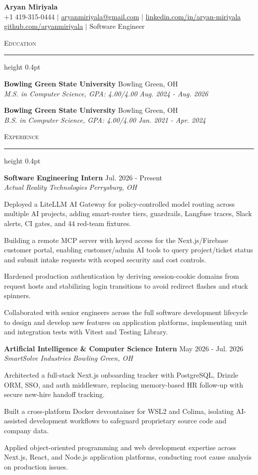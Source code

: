 \documentclass[letterpaper,11pt]{article}
\newcommand{\resumesection}[1]{%
  \par\vspace{2pt}%
  {\large\scshape #1}\par\vspace{2pt}%
  \hrule height 0.4pt\vspace{2pt}%
}
\newcommand{\resumeSubheading}[4]{
  \textbf{#1} \hfill #2\\
  \textit{#3} \hfill \textit{#4}
}
\begin{document}
\begin{center}
  {\LARGE \textbf{Aryan Miriyala}}\\[2pt]
  \small
  +1 419-315-0444 $|$ \href{mailto:aryanmiriyala@gmail.com}{aryanmiriyala@gmail.com} $|$ \href{https://www.linkedin.com/in/aryan-miriyala-7788a21b6/}{linkedin.com/in/aryan-miriyala}\\
  \href{https://github.com/aryanmiriyala}{github.com/aryanmiriyala} $|$ Software Engineer
\end{center}\vspace{-6pt}

\resumesection{Education}
\resumeSubheading
{Bowling Green State University}{Bowling Green, OH}
{M.S. in Computer Science, GPA: 4.00/4.00}{Aug. 2024 - Aug. 2026}

\resumeSubheading
{Bowling Green State University}{Bowling Green, OH}
{B.S. in Computer Science, GPA: 4.00/4.00}{Jan. 2021 - Apr. 2024}

\resumesection{Experience}
\resumeSubheading
{Software Engineering Intern}{Jul. 2026 - Present}
{Actual Reality Technologies}{Perrysburg, OH}
\begin{tightitemize}
  \item Deployed a LiteLLM AI Gateway for policy-controlled model routing across multiple AI projects, adding smart-router tiers, guardrails, Langfuse traces, Slack alerts, CI gates, and 44 red-team fixtures.
  \item Building a remote MCP server with keyed access for the Next.js/Firebase customer portal, enabling customer/admin AI tools to query project/ticket status and submit intake requests with scoped security and cost controls.
  \item Hardened production authentication by deriving session-cookie domains from request hosts and stabilizing login transitions to avoid redirect flashes and stuck spinners.
  \item Collaborated with senior engineers across the full software development lifecycle to design and develop new features on application platforms, implementing unit and integration tests with Vitest and Testing Library.
\end{tightitemize}

\resumeSubheading
{Artificial Intelligence \& Computer Science Intern}{May 2026 - Jul. 2026}
{SmartSolve Industries}{Bowling Green, OH}
\begin{tightitemize}
  \item Architected a full-stack Next.js onboarding tracker with PostgreSQL, Drizzle ORM, SSO, and auth middleware, replacing memory-based HR follow-up with secure new-hire handoff tracking.
  \item Built a cross-platform Docker devcontainer for WSL2 and Colima, isolating AI-assisted development workflows to safeguard proprietary source code and company data.
  \item Applied object-oriented programming and web development expertise across Next.js, React, and Node.js application platforms, conducting root cause analysis on production issues.
\end{tightitemize}
\end{document}
